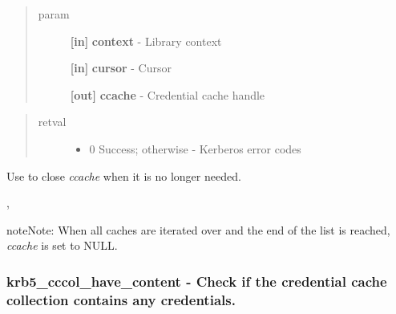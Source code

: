 \documentclass[letterpaper,10pt,english]{sphinxmanual}
\begin{document}
\begin{quote}\begin{description}
\item[{param}] \leavevmode
\textbf{{[}in{]}} \textbf{context} - Library context

\textbf{{[}in{]}} \textbf{cursor} - Cursor

\textbf{{[}out{]}} \textbf{ccache} - Credential cache handle

\end{description}\end{quote}
\begin{quote}\begin{description}
\item[{retval}] \leavevmode\begin{itemize}
\item {} 
0   Success; otherwise - Kerberos error codes

\end{itemize}

\end{description}\end{quote}

Use {\hyperref[appdev/refs/api/krb5_cc_close:c.krb5_cc_close]{}} to close \emph{ccache} when it is no longer needed.




{\hyperref[appdev/refs/api/krb5_cccol_cursor_new:c.krb5_cccol_cursor_new]{}} , {\hyperref[appdev/refs/api/krb5_cccol_cursor_free:c.krb5_cccol_cursor_free]{}}



\begin{notice}{note}{Note:}
When all caches are iterated over and the end of the list is reached, \emph{ccache} is set to NULL.
\end{notice}


\subsubsection{krb5\_cccol\_have\_content -  Check if the credential cache collection contains any credentials.}
\label{appdev/refs/api/krb5_cccol_have_content:krb5-cccol-have-content-check-if-the-credential-cache-collection-contains-any-credentials}\label{appdev/refs/api/krb5_cccol_have_content::doc}

\begin{fulllineitems}
\label{appdev/refs/api/krb5_cccol_have_content:c.krb5_cccol_have_content}
\end{fulllineitems}
\end{document}
